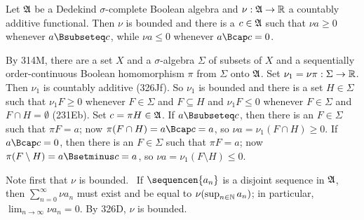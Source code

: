 
Let $\frak A$ be a
Dedekind $\sigma$-complete Boolean algebra and $\nu:\frak A\to\Bbb R$ a
countably additive functional.   Then $\nu$ is bounded and there is a
$c\in\frak A$ such that $\nu a\ge 0$ whenever $a\Bsubseteq c$, while
$\nu a\le 0$ whenever $a\Bcap c=0$.

\ifwithproofs
\medskip

 By 314M, there are a set $X$ and a
$\sigma$-algebra $\Sigma$ of subsets of $X$ and a sequentially
order-continuous Boolean homomorphism $\pi$ from $\Sigma$ onto
$\frak A$.   Set $\nu_1=\nu\pi:\Sigma\to\Bbb R$.   Then $\nu_1$ is
countably additive (326Jf).   So $\nu_1$ is bounded and there is a set
$H\in\Sigma$
such that $\nu_1F\ge 0$ whenever $F\in\Sigma$ and $F\subseteq H$ and
$\nu_1F\le 0$ whenever $F\in\Sigma$ and $F\cap H=\emptyset$ (231Eb).
Set $c=\pi H\in\frak A$.   If $a\Bsubseteq c$, then there is an
$F\in\Sigma$ such that $\pi F=a$;  now $\pi(F\cap H)=a\Bcap c=a$, so
$\nu a=\nu_1(F\cap H)\ge 0$.   If $a\Bcap c=0$, then there is an
$F\in\Sigma$
such that $\pi F=a$;  now $\pi(F\setminus H)=a\Bsetminus c=a$, so
$\nu a=\nu_1(F\setminus H)\le 0$.

\medskip

 Note first that $\nu$ is bounded.
\Prf\ If $\sequencen{a_n}$ is a disjoint sequence in $\frak A$, then
$\sum_{n=0}^{\infty}\nu a_n$ must exist and be equal to
$\nu(\sup_{n\in\Bbb N}a_n)$;  in particular,
$\lim_{n\to\infty}\nu a_n=0$.   By 326D, $\nu$ is bounded.
\Qed

